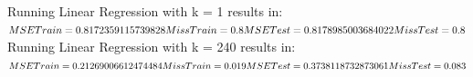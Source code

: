 \documentclass[a4paper]{article}
\begin{document}
\begin{multicols}{2}

Running Linear Regression with k = 1 results in: \\

$MSE Train = 0.8172359115739828 \\ Miss Train = 0.8 \\ MSE Test = 0.8178985003684022 \\ Miss Test = 0.8$ \\

Running Linear Regression with k = 240 results in: \\

$MSE Train = 0.21269006612474484 \\ Miss Train = 0.019 \\ MSE Test = 0.3738118732873061 \\ Miss Test = 0.083$
\\

\end{multicols}
\end{document}
